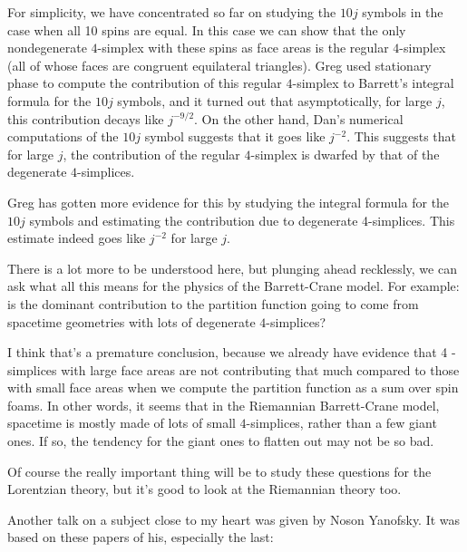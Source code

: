 \documentclass{article}
\renewcommand{\texttt}[1]{%
  \begingroup
  \ttfamily
  \begingroup\lccode`~=`/\lowercase{\endgroup\def~}{/\discretionary{}{}{}}%
  \begingroup\lccode`~=`[\lowercase{\endgroup\def~}{[\discretionary{}{}{}}%
  \begingroup\lccode`~=`.\lowercase{\endgroup\def~}{.\discretionary{}{}{}}%
  \catcode`/=\active\catcode`[=\active\catcode`.=\active
  \scantokens{#1\noexpand}%
  \endgroup
}
\begin{document}
For simplicity, we have concentrated so far on studying the \(10j\)
symbols in the case when all 10 spins are equal. In this case we can
show that the only nondegenerate \(4\)-simplex with these spins as face
areas is the regular \(4\)-simplex (all of whose faces are congruent
equilateral triangles). Greg used stationary phase to compute the
contribution of this regular \(4\)-simplex to Barrett's integral formula
for the \(10j\) symbols, and it turned out that asymptotically, for
large \(j\), this contribution decays like \(j^{-9/2}\). On the other
hand, Dan's numerical computations of the \(10j\) symbol suggests that
it goes like \(j^{-2}\). This suggests that for large \(j\), the
contribution of the regular \(4\)-simplex is dwarfed by that of the
degenerate \(4\)-simplices.

Greg has gotten more evidence for this by studying the integral formula
for the \(10j\) symbols and estimating the contribution due to
degenerate 4-simplices. This estimate indeed goes like \(j^{-2}\) for
large \(j\).

There is a lot more to be understood here, but plunging ahead
recklessly, we can ask what all this means for the physics of the
Barrett-Crane model. For example: is the dominant contribution to the
partition function going to come from spacetime geometries with lots of
degenerate \(4\)-simplices?

I think that's a premature conclusion, because we already have evidence
that 4 -simplices with large face areas are not contributing that much
compared to those with small face areas when we compute the partition
function as a sum over spin foams. In other words, it seems that in the
Riemannian Barrett-Crane model, spacetime is mostly made of lots of
small \(4\)-simplices, rather than a few giant ones. If so, the tendency
for the giant ones to flatten out may not be so bad.

Of course the really important thing will be to study these questions
for the Lorentzian theory, but it's good to look at the Riemannian
theory too.

Another talk on a subject close to my heart was given by Noson Yanofsky.
It was based on these papers of his, especially the last:

\end{document}
